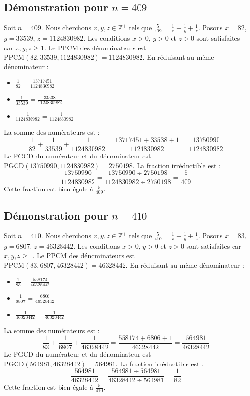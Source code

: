 \documentclass[11pt,a4paper]{article}
\begin{document}
\subsection{Démonstration pour $n = 409$}
Soit $n = 409$. Nous cherchons $x, y, z \in \mathbb{Z}^{+}$ tels que $\frac{5}{409} = \frac{1}{x} + \frac{1}{y} + \frac{1}{z}$.
Posons $x = 82$, $y = 33539$, $z = 1124830982$.
Les conditions $x > 0$, $y > 0$ et $z > 0$ sont satisfaites car $x, y, z \geq 1$.
Le PPCM des dénominateurs est $\text{PPCM}(82, 33539, 1124830982) = 1124830982$.
En réduisant au même dénominateur :
\begin{itemize}
    \item $\frac{1}{82} = \frac{13717451}{1124830982}$
    \item $\frac{1}{33539} = \frac{33538}{1124830982}$
    \item $\frac{1}{1124830982} = \frac{1}{1124830982}$
\end{itemize}
La somme des numérateurs est :
$$ \frac{1}{82} + \frac{1}{33539} + \frac{1}{1124830982} = \frac{13717451 + 33538 + 1}{1124830982} = \frac{13750990}{1124830982} $$
Le PGCD du numérateur et du dénominateur est $\text{PGCD}(13750990, 1124830982) = 2750198$.
La fraction irréductible est :
$$ \frac{13750990}{1124830982} = \frac{13750990 \div 2750198}{1124830982 \div 2750198} = \frac{5}{409} $$
Cette fraction est bien égale à $\frac{5}{409}$.

\subsection{Démonstration pour $n = 410$}
Soit $n = 410$. Nous cherchons $x, y, z \in \mathbb{Z}^{+}$ tels que $\frac{5}{410} = \frac{1}{x} + \frac{1}{y} + \frac{1}{z}$.
Posons $x = 83$, $y = 6807$, $z = 46328442$.
Les conditions $x > 0$, $y > 0$ et $z > 0$ sont satisfaites car $x, y, z \geq 1$.
Le PPCM des dénominateurs est $\text{PPCM}(83, 6807, 46328442) = 46328442$.
En réduisant au même dénominateur :
\begin{itemize}
    \item $\frac{1}{83} = \frac{558174}{46328442}$
    \item $\frac{1}{6807} = \frac{6806}{46328442}$
    \item $\frac{1}{46328442} = \frac{1}{46328442}$
\end{itemize}
La somme des numérateurs est :
$$ \frac{1}{83} + \frac{1}{6807} + \frac{1}{46328442} = \frac{558174 + 6806 + 1}{46328442} = \frac{564981}{46328442} $$
Le PGCD du numérateur et du dénominateur est $\text{PGCD}(564981, 46328442) = 564981$.
La fraction irréductible est :
$$ \frac{564981}{46328442} = \frac{564981 \div 564981}{46328442 \div 564981} = \frac{1}{82} $$
Cette fraction est bien égale à $\frac{5}{410}$.
\end{document}
